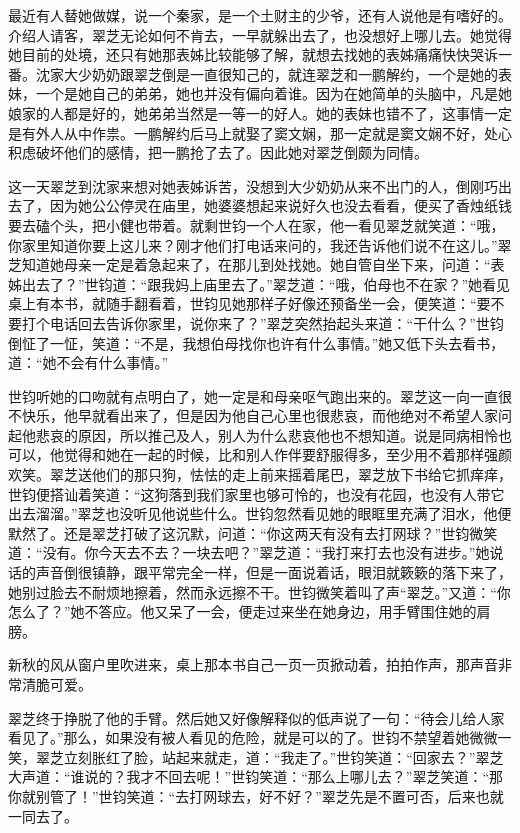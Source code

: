 \par 最近有人替她做媒，说一个秦家，是一个土财主的少爷，还有人说他是有嗜好的。介绍人请客，翠芝无论如何不肯去，一早就躲出去了，也没想好上哪儿去。她觉得她目前的处境，还只有她那表姊比较能够了解，就想去找她的表姊痛痛快快哭诉一番。沈家大少奶奶跟翠芝倒是一直很知己的，就连翠芝和一鹏解约，一个是她的表妹，一个是她自己的弟弟，她也并没有偏向着谁。因为在她简单的头脑中，凡是她娘家的人都是好的，她弟弟当然是一等一的好人。她的表妹也错不了，这事情一定是有外人从中作祟。一鹏解约后马上就娶了窦文娴，那一定就是窦文娴不好，处心积虑破坏他们的感情，把一鹏抢了去了。因此她对翠芝倒颇为同情。
\par 这一天翠芝到沈家来想对她表姊诉苦，没想到大少奶奶从来不出门的人，倒刚巧出去了，因为她公公停灵在庙里，她婆婆想起来说好久也没去看看，便买了香烛纸钱要去磕个头，把小健也带着。就剩世钧一个人在家，他一看见翠芝就笑道：“哦，你家里知道你要上这儿来？刚才他们打电话来问的，我还告诉他们说不在这儿。”翠芝知道她母亲一定是着急起来了，在那儿到处找她。她自管自坐下来，问道：“表姊出去了？”世钧道：“跟我妈上庙里去了。”翠芝道：“哦，伯母也不在家？”她看见桌上有本书，就随手翻看着，世钧见她那样子好像还预备坐一会，便笑道：“要不要打个电话回去告诉你家里，说你来了？”翠芝突然抬起头来道：“干什么？”世钧倒怔了一怔，笑道：“不是，我想伯母找你也许有什么事情。”她又低下头去看书，道：“她不会有什么事情。”
\par 世钧听她的口吻就有点明白了，她一定是和母亲呕气跑出来的。翠芝这一向一直很不快乐，他早就看出来了，但是因为他自己心里也很悲哀，而他绝对不希望人家问起他悲哀的原因，所以推己及人，别人为什么悲哀他也不想知道。说是同病相怜也可以，他觉得和她在一起的时候，比和别人作伴要舒服得多，至少用不着那样强颜欢笑。翠芝送他们的那只狗，怯怯的走上前来摇着尾巴，翠芝放下书给它抓痒痒，世钧便搭讪着笑道：“这狗落到我们家里也够可怜的，也没有花园，也没有人带它出去溜溜。”翠芝也没听见他说些什么。世钧忽然看见她的眼眶里充满了泪水，他便默然了。还是翠芝打破了这沉默，问道：“你这两天有没有去打网球？”世钧微笑道：“没有。你今天去不去？一块去吧？”翠芝道：“我打来打去也没有进步。”她说话的声音倒很镇静，跟平常完全一样，但是一面说着话，眼泪就簌簌的落下来了，她别过脸去不耐烦地擦着，然而永远擦不干。世钧微笑着叫了声“翠芝。”又道：“你怎么了？”她不答应。他又呆了一会，便走过来坐在她身边，用手臂围住她的肩膀。
\par 新秋的风从窗户里吹进来，桌上那本书自己一页一页掀动着，拍拍作声，那声音非常清脆可爱。
\par 翠芝终于挣脱了他的手臂。然后她又好像解释似的低声说了一句：“待会儿给人家看见了。”那么，如果没有被人看见的危险，就是可以的了。世钧不禁望着她微微一笑，翠芝立刻胀红了脸，站起来就走，道：“我走了。”世钧笑道：“回家去？”翠芝大声道：“谁说的？我才不回去呢！”世钧笑道：“那么上哪儿去？”翠芝笑道：“那你就别管了！”世钧笑道：“去打网球去，好不好？”翠芝先是不置可否，后来也就一同去了。
